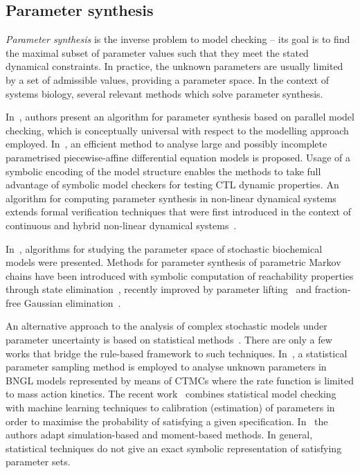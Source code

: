 \documentclass[11pt,a4paper]{report}
\begin{document}
\subsection{Parameter synthesis}\label{synthesis}

\emph{Parameter synthesis} is the inverse problem to model checking -- its goal is to find the maximal subset of parameter values such that they meet the stated dynamical constraints. In practice, the unknown parameters are usually limited by a set of admissible values, providing a parameter space. In the context of systems biology, several relevant methods which solve parameter synthesis. 

In~\cite{barnat2011parameter}, authors present an algorithm for parameter synthesis based on parallel model checking, which is conceptually universal with respect to the modelling approach employed. In~\cite{batt2010efficient}, an efficient method to analyse large and possibly incomplete parametrised piecewise-affine differential equation models is proposed. Usage of a symbolic encoding of the model structure enables the methods to take full advantage of symbolic model checkers for testing CTL dynamic properties. An algorithm for computing parameter synthesis in non-linear dynamical systems~\cite{donze2010parameter} extends formal verification techniques that were first introduced in the context of continuous and hybrid non-linear dynamical systems~\cite{donze2007systematic}.

In~\cite{jha2011synthesis}, algorithms for studying the parameter space of stochastic biochemical models were presented. Methods for parameter synthesis of parametric Markov chains have been introduced with symbolic computation of reachability properties through state elimination~\cite{daws2004symbolic,jansen2014accelerating,hahn2011probabilistic}, recently improved by parameter lifting~\cite{quatmann2016parameter} and fraction-free Gaussian elimination~\cite{hutschenreiter2017parametric}.

An alternative approach to the analysis of complex stochastic models under
parameter uncertainty is based on statistical methods~\cite{Luck2016,BackenkohlerBW18,Bortolussi2016,Bortolussi2018}. There are only a few works that bridge the rule-based framework to such techniques. In~\cite{liu2016parameter}, a statistical parameter sampling method is employed to analyse unknown parameters in BNGL models represented by means of CTMCs where the rate function is limited to mass action kinetics. The recent work~\cite{KJ18} combines statistical model checking with machine learning techniques to calibration (estimation) of parameters in order to maximise the probability of satisfying a given specification. In~\cite{Bock15} the authors adapt simulation-based and moment-based methods. In general, statistical techniques do not give an exact symbolic representation of satisfying parameter sets. 
\end{document}
